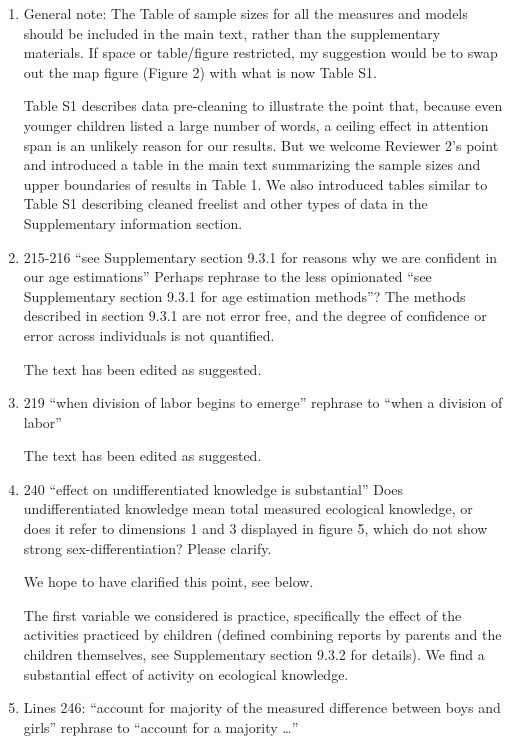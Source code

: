 \documentclass{article}
\newcommand{\rev}[1]{{\color{Red}#1}}
\newcommand{\comment}[1]{{\color{Blue}#1}}
\begin{document}
\begin{enumerate}
    \item General note: The Table of sample sizes for all the measures and models should be included in the main text, rather than the supplementary materials. If space or table/figure restricted, my suggestion would be to swap out the map figure (Figure 2) with what is now Table S1.
    
    \comment{Table S1 describes data pre-cleaning to illustrate the point that, because even younger children listed a large number of words, a ceiling effect in attention span is an unlikely reason for our results. But we welcome Reviewer 2's point and introduced a table in the main text summarizing the sample sizes and upper boundaries of results in Table 1. We also introduced tables similar to Table S1 describing cleaned freelist and other types of data in the Supplementary information section.  }
 
    \item 215-216 “see Supplementary section 9.3.1 for reasons why we are confident in our age estimations” Perhaps rephrase to the less opinionated “see Supplementary section 9.3.1 for age estimation methods”? The methods described in section 9.3.1 are not error free, and the degree of confidence or error across individuals is not quantified.

    \comment{The text has been edited as suggested. }

    \item 219 “when division of labor begins to emerge” rephrase to “when a division of labor”

    \comment{The text has been edited as suggested. }

    \item 240 “effect on undifferentiated knowledge is substantial” Does undifferentiated knowledge mean total measured ecological knowledge, or does it refer to dimensions 1 and 3 displayed in figure 5, which do not show strong sex-differentiation? Please clarify.
    
    \comment{We hope to have clarified this point, see below.}

    \rev{The first variable we considered is practice, specifically the effect of the activities practiced by children (defined combining reports by parents and the children themselves, see Supplementary section 9.3.2 for details). We find a substantial effect of activity on ecological knowledge. }

    \item Lines 246: “account for majority of the measured difference between boys and girls” rephrase to “account for a majority …”


\end{enumerate}
\end{document}
